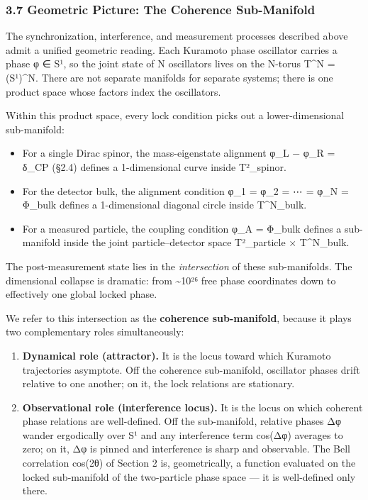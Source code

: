 \documentclass[
]{article}
\providecommand{\tightlist}{%
  \setlength{\itemsep}{0pt}\setlength{\parskip}{0pt}}
\begin{document}
\subsubsection{3.7 Geometric Picture: The Coherence
Sub-Manifold}\label{geometric-picture-the-coherence-sub-manifold}

The synchronization, interference, and measurement processes described
above admit a unified geometric reading. Each Kuramoto phase oscillator
carries a phase φ ∈ S¹, so the joint state of N oscillators lives on the
N-torus T\^{}N = (S¹)\^{}N. There are not separate manifolds for
separate systems; there is one product space whose factors index the
oscillators.

Within this product space, every lock condition picks out a
lower-dimensional sub-manifold:

\begin{itemize}
\tightlist
\item
  For a single Dirac spinor, the mass-eigenstate alignment φ\_L − φ\_R =
  δ\_CP (§2.4) defines a 1-dimensional curve inside T²\_spinor.
\item
  For the detector bulk, the alignment condition φ\_1 = φ\_2 = ⋯ = φ\_N
  = Φ\_bulk defines a 1-dimensional diagonal circle inside T\^{}N\_bulk.
\item
  For a measured particle, the coupling condition φ\_A = Φ\_bulk defines
  a sub-manifold inside the joint particle--detector space T²\_particle
  × T\^{}N\_bulk.
\end{itemize}

The post-measurement state lies in the \emph{intersection} of these
sub-manifolds. The dimensional collapse is dramatic: from
\textasciitilde10²⁶ free phase coordinates down to effectively one
global locked phase.

We refer to this intersection as the \textbf{coherence sub-manifold},
because it plays two complementary roles simultaneously:

\begin{enumerate}
\def\labelenumi{\arabic{enumi}.}
\tightlist
\item
  \textbf{Dynamical role (attractor).} It is the locus toward which
  Kuramoto trajectories asymptote. Off the coherence sub-manifold,
  oscillator phases drift relative to one another; on it, the lock
  relations are stationary.
\item
  \textbf{Observational role (interference locus).} It is the locus on
  which coherent phase relations are well-defined. Off the sub-manifold,
  relative phases Δφ wander ergodically over S¹ and any interference
  term cos(Δφ) averages to zero; on it, Δφ is pinned and interference is
  sharp and observable. The Bell correlation cos(2θ) of Section 2 is,
  geometrically, a function evaluated on the locked sub-manifold of the
  two-particle phase space --- it is well-defined only there.
\end{enumerate}
\end{document}
